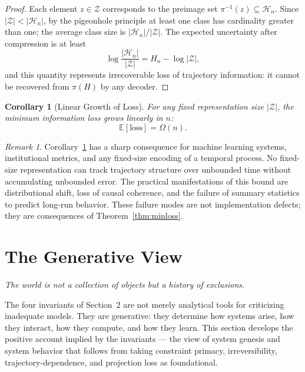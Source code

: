 \documentclass[12pt, twoside]{article}
\theoremstyle{plain}
\newtheorem{corollary}[theorem]{Corollary}
\theoremstyle{definition}
\theoremstyle{remark}
\newtheorem{remark}[theorem]{Remark}
\begin{document}
\begin{proof}
Each element $z \in \mathcal{Z}$ corresponds to the preimage set
$\pi^{-1}(z) \subseteq \mathcal{H}_n$.
Since $|\mathcal{Z}| < |\mathcal{H}_n|$, by the pigeonhole principle
at least one class has cardinality greater than one;
the average class size is $|\mathcal{H}_n| / |\mathcal{Z}|$.
The expected uncertainty after compression is at least
\[
  \log \frac{|\mathcal{H}_n|}{|\mathcal{Z}|}
  = H_n - \log |\mathcal{Z}|,
\]
and this quantity represents irrecoverable loss of trajectory
information: it cannot be recovered from $\pi(H)$ by any decoder.
\end{proof}

\begin{corollary}[Linear Growth of Loss]
\label{cor:linearloss}
For any fixed representation size $|\mathcal{Z}|$,
the minimum information loss grows linearly in $n$:
\[
  \mathbb{E}[\mathrm{loss}] = \Omega(n).
\]
\end{corollary}

\begin{remark}
Corollary~\ref{cor:linearloss} has a sharp consequence for
machine learning systems, institutional metrics, and any
fixed-size encoding of a temporal process.
No fixed-size representation can track trajectory structure over
unbounded time without accumulating unbounded error.
The practical manifestations of this bound are distributional shift,
loss of causal coherence, and the failure of summary statistics
to predict long-run behavior.
These failure modes are not implementation defects;
they are consequences of Theorem~\ref{thm:minloss}.
\end{remark}

\newpage

\section{The Generative View}

\epigraph{\itshape
  The world is not a collection of objects but a history of exclusions.}{}

The four invariants of Section~2 are not merely analytical tools
for criticizing inadequate models.
They are generative: they determine how systems arise, how they interact,
how they compute, and how they learn.
This section develops the positive account implied by the invariants —
the view of system genesis and system behavior that follows from taking
constraint primacy, irreversibility, trajectory-dependence, and
projection loss as foundational.
\end{document}
